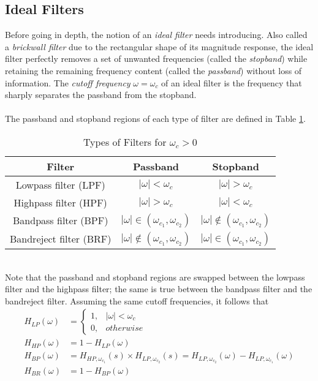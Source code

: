 \documentclass{report}
\begin{document}
\subsection{Ideal Filters}
Before going in depth, the notion of an \emph{ideal filter} needs introducing. Also called a \emph{brickwall filter} due to the rectangular shape of its magnitude response, the ideal filter perfectly removes a set of unwanted frequencies (called the \emph{stopband}) 
while retaining the remaining frequency content (called the \emph{passband}) without loss of information. The \emph{cutoff frequency} $\omega=\omega_c$ of an ideal filter is the frequency that sharply separates the passband from the stopband.
\\ \\
The passband and stopband regions of each type of filter are defined in Table \ref{filter_type}.
\begin{table}[!hbt]
    \centering
    \caption{Types of Filters for $\omega_c>0$}
    \label{filter_type}
    \begin{tabular}{|c|c|c|}
        \hline
        Filter & Passband & Stopband \\
        \hline
        Lowpass filter (LPF) & $|\omega|<\omega_c$ & $|\omega|>\omega_c$ \\
        Highpass filter (HPF) & $|\omega|>\omega_c$ & $|\omega|<\omega_c$ \\
        Bandpass filter (BPF) & $|\omega|\in(\omega_{c_1},\omega_{c_2})$ & $|\omega|\notin(\omega_{c_1},\omega_{c_2})$ \\
        Bandreject filter (BRF) & $|\omega|\notin(\omega_{c_1},\omega_{c_2})$ & $|\omega|\in(\omega_{c_1},\omega_{c_2})$ \\
        \hline
    \end{tabular}
\end{table}
\\
Note that the passband and stopband regions are swapped between the lowpass filter and the highpass filter; the same is true between the bandpass filter and the bandreject filter. 
Assuming the same cutoff frequencies, it follows that 
\begin{align}
    H_{LP}(\omega) &= 
    \begin{cases}
        1, & |\omega| < \omega_c \\
        0, & otherwise
    \end{cases} \\
    H_{HP}(\omega) &= 1 - H_{LP}(\omega) \\ 
    H_{BP}(\omega) &= H_{HP,\omega_{c_1}}(s)\times H_{LP,\omega_{c_2}}(s) = H_{LP,\omega_{c_2}}(\omega) - H_{LP,\omega_{c_1}}(\omega) \\
    H_{BR}(\omega) &= 1 - H_{BP}(\omega)
\end{align}
\end{document}
